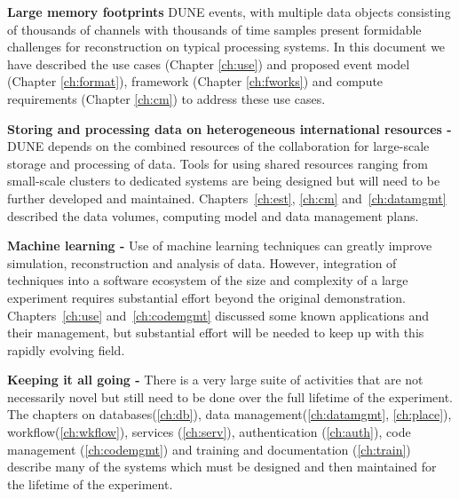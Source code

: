 \documentclass[../main-v1.tex]{subfiles}
\begin{document}
\begin{description}
\item{\bf Large memory footprints}  DUNE events, with multiple data objects consisting of  thousands of channels with thousands of time samples   present formidable challenges for reconstruction on typical  processing systems.  In this document we have described the use cases (Chapter \ref{ch:use}) and proposed event model (Chapter \ref {ch:format}), framework (Chapter \ref{ch:fworks}) and compute requirements (Chapter \ref{ch:cm}) to address these use cases. 




\item{\bf Storing and processing data on heterogeneous international  resources -} 
DUNE depends on the combined resources of the collaboration for large-scale storage and processing of data.   Tools for using shared resources ranging from small-scale clusters to dedicated  systems are being designed but will need to be further developed and maintained.  
Chapters~\ref{ch:est}, \ref{ch:cm} and~\ref{ch:datamgmt} described the data volumes, computing model and data management plans. 

\item{
\bf Machine learning - }  Use of machine learning techniques can greatly improve simulation, reconstruction and analysis of data. However, integration of  techniques into a software ecosystem of the size and complexity of a large  experiment requires substantial effort beyond the original demonstration. 
Chapters~\ref{ch:use} and~\ref{ch:codemgmt} discussed some known applications and their management, but substantial effort will be needed to keep up with this rapidly evolving field. 

\item{\bf Keeping it all going -}  %
There is a very large suite of activities that are 
not necessarily novel but
still need to be done over the full lifetime of the experiment. The chapters  on databases(\ref{ch:db}), data management(\ref{ch:datamgmt}, \ref{ch:place}), workflow(\ref{ch:wkflow}), 
services (\ref{ch:serv}), authentication (\ref{ch:auth}), code management (\ref{ch:codemgmt}) and training and documentation (\ref{ch:train})
describe many of the systems which must be designed and then maintained for the lifetime of the experiment. 


\end{description}
\end{document}
